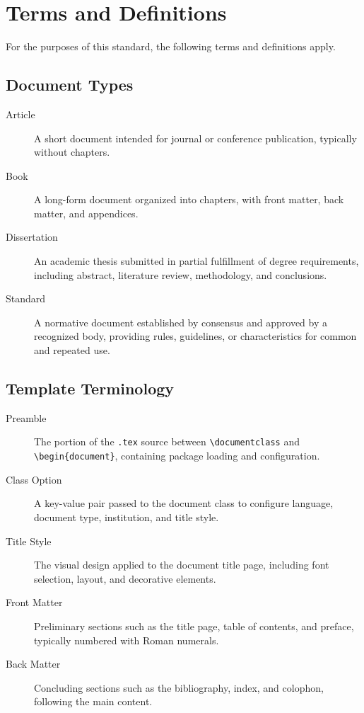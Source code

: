 \documentclass[
    language=english,
    doctype=standard,
    institution=none,
    titlestyle=book,
    oneside,
]{../../omnilatex}
\begin{document}
\section{Terms and Definitions}

For the purposes of this standard, the following terms and definitions apply.

\subsection{Document Types}

\begin{description}
    \item[Article] A short document intended for journal or conference publication, typically without chapters.
    \item[Book] A long-form document organized into chapters, with front matter, back matter, and appendices.
    \item[Dissertation] An academic thesis submitted in partial fulfillment of degree requirements, including abstract, literature review, methodology, and conclusions.
    \item[Standard] A normative document established by consensus and approved by a recognized body, providing rules, guidelines, or characteristics for common and repeated use.
\end{description}

\subsection{Template Terminology}

\begin{description}
    \item[Preamble] The portion of the \texttt{.tex} source between \texttt{\textbackslash documentclass} and \texttt{\textbackslash begin\{document\}}, containing package loading and configuration.
    \item[Class Option] A key-value pair passed to the document class to configure language, document type, institution, and title style.
    \item[Title Style] The visual design applied to the document title page, including font selection, layout, and decorative elements.
    \item[Front Matter] Preliminary sections such as the title page, table of contents, and preface, typically numbered with Roman numerals.
    \item[Back Matter] Concluding sections such as the bibliography, index, and colophon, following the main content.
\end{description}
\end{document}
